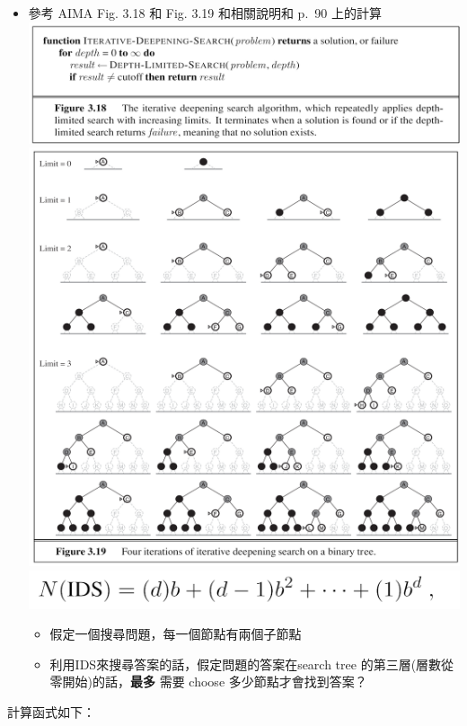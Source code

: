 \documentclass[11pt]{article}
\providecommand{\tightlist}{%
      \setlength{\itemsep}{0pt}\setlength{\parskip}{0pt}}
\begin{document}
    \begin{itemize}
\tightlist
\item
  參考 AIMA Fig. 3.18 和 Fig. 3.19 和相關說明和 p.~90 上的計算
  \includegraphics{aima-fig-3_18.png}
  \includegraphics{aima-fig-3_19.png}
  \includegraphics{aima-fun-ids.png}

  \begin{itemize}
  \tightlist
  \item
    假定一個搜尋問題，每一個節點有兩個子節點
  \item
    利用IDS來搜尋答案的話，假定問題的答案在search tree
    的第三層(層數從零開始)的話，\textbf{最多} 需要 choose
    多少節點才會找到答案？
  \end{itemize}
\end{itemize}

計算函式如下：
\end{document}
